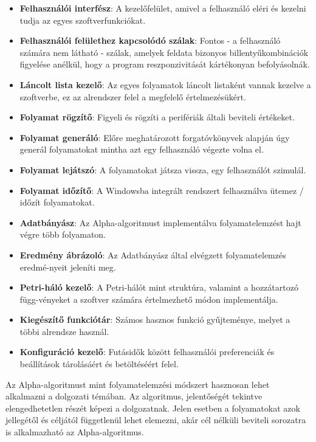 \begin{itemize}
	\item \textbf{Felhasználói interfész}: A kezelőfelület, amivel a felhasználó eléri és kezelni tudja az egyes szoftverfunkciókat.
	\item \textbf{Felhasználói felülethez kapcsolódó szálak}: Fontos - a felhasználó számára nem látható - szálak, amelyek feldata bizonyos billentyűkombinációk figyelése anélkül, hogy a program reszponzivitását kártékonyan befolyásolnák.
	\item \textbf{Láncolt lista kezelő}: Az egyes folyamatok láncolt listaként vannak kezelve a szoftverbe, ez az alrendszer felel a megfelelő értelmezésükért. 
	\item \textbf{Folyamat rögzítő}: Figyeli és rögzíti a perifériák általi beviteli értékeket.
	\item \textbf{Folyamat generáló}: Előre meghatározott forgatóvkönyvek alapján úgy generál folyamatokat mintha azt egy felhasználó végezte volna el.
	\item \textbf{Folyamat lejátszó}: A folyamatokat játsza vissza, egy felhasználót szimulál.
	\item \textbf{Folyamat időzítő}: A Windowsba integrált rendszert felhasználva ütemez / időzít folyamatokat.
	\item \textbf{Adatbányász}: Az Alpha-algoritmust implementálva folyamatelemzést hajt végre több folyamaton.
	\item \textbf{Eredmény ábrázoló}: Az Adatbányász által elvégzett folyamatelemzés eredmé\hyp{}nyeit jeleníti meg.
	\item \textbf{Petri-háló kezelő}: A Petri-hálót mint struktúra, valamint a hozzátartozó függ\hyp{}vényeket a szoftver számára értelmezhető módon implementálja.
	\item \textbf{Kiegészítő funkciótár}: Számos hasznos funkció gyűjteménye, melyet a többi alrendsze használ.
	\item \textbf{Konfiguráció kezelő}: Futásidők között felhasználói preferenciák és beállítások tárolásáért és betöltéséért felel.
\end{itemize}


Az Alpha-algoritmust mint folyamatelemzési módszert hasznosan lehet alkalmazni a dolgozati témában. Az algoritmus, jelentőségét tekintve elengedhetetlen részét képezi a dolgozatnak. Jelen esetben a folyamatokat azok jellegétől és céljától függetlenül lehet elemezni, akár cél nélküli beviteli sorozatra is alkalmazható az Alpha-algoritmus.

